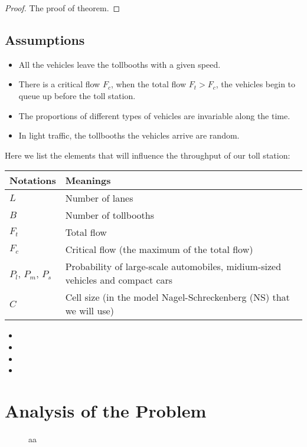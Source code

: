 \documentclass{mcmthesis}
\begin{document}
\begin{proof}
The proof of theorem.
\end{proof}

\subsection{Assumptions}

\begin{itemize}
	\item All the vehicles leave the tollbooths with a given speed.
	\item There is a critical flow $F_c$, when the total flow  $F_t>F_c$, the vehicles begin to queue up before the toll station.
	\item The proportions of different types of vehicles are invariable along the time.
	\item In light traffic, the tollbooths the vehicles arrive are random.
\end{itemize}



Here we list the elements that will influence the throughput of our toll station:

\begin{tabular}{|m{7cm}<{\centering}|p{7cm}<{\centering}|}
	\hline
	Notations & Meanings \\
	\hline
	 $L$ &  Number of lanes \\
	\hline
	 $B$ &  Number of tollbooths\\
	 \hline
     $F_t$ & 	 Total flow\\
     \hline
     $F_c$ & Critical flow (the maximum of the total flow)\\
     \hline
     $P_l$,  $P_m$, $P_s$ & Probability of large-scale automobiles, midium-sized vehicles and compact cars\\
     \hline
    $C$ & Cell size (in the model Nagel-Schreckenberg (NS) that we will use)\\
    \hline
     
\end{tabular}

\begin{itemize}
\item
\item
\item
\item
\end{itemize}



\section{Analysis of the Problem}
\begin{figure}[h]
\small
\centering
\caption{aa} \label{fig:aa}
\end{figure}
\end{document}
